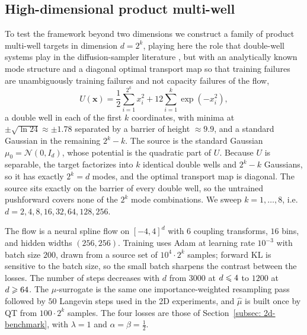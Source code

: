 \documentclass{article}
\begin{document}
\subsection{High-dimensional product multi-well}
\label{subsec: highd}

To test the framework beyond two dimensions we construct a family of product multi-well targets in dimension $d = 2^k$, playing here the role that double-well systems play in the diffusion-sampler literature \citep{akhound2024iterated,woo2024iefm}, but with an analytically known mode structure and a diagonal optimal transport map so that training failures are unambiguously training failures and not capacity failures of the flow,
\begin{equation}
    U(\mathbf{x}) = \frac12 \sum_{i=1}^{2^k} x_i^2 + 12 \sum_{i=1}^{k} \exp(-x_i^2),
    \label{eq: highd-potential}
\end{equation}
a double well in each of the first $k$ coordinates, with minima at $\pm\sqrt{\ln 24} \approx \pm 1.78$ separated by a barrier of height $\approx 9.9$, and a standard Gaussian in the remaining $2^k - k$. The source is the standard Gaussian $\mu_0 = \mathcal N(0, I_d)$, whose potential is the quadratic part of $U$. Because $U$ is separable, the target factorizes into $k$ identical double wells and $2^k - k$ Gaussians, so it has exactly $2^k = d$ modes, and the optimal transport map is diagonal. The source sits exactly on the barrier of every double well, so the untrained pushforward covers none of the $2^k$ mode combinations. We sweep $k = 1, \dots, 8$, i.e.\ $d = 2, 4, 8, 16, 32, 64, 128, 256$.

The flow is a neural spline flow on $[-4, 4]^d$ with $6$ coupling transforms, $16$ bins, and hidden widths $(256, 256)$. Training uses Adam at learning rate $10^{-3}$ with batch size $200$, drawn from a source set of $10^4 \cdot 2^k$ samples; forward KL is sensitive to the batch size, so the small batch sharpens the contrast between the losses. The number of steps decreases with $d$ from $3000$ at $d \leqslant 4$ to $1200$ at $d \geqslant 64$. The $\mu$-surrogate is the same one importance-weighted resampling pass followed by $50$ Langevin steps used in the 2D experiments, and $\hat\mu$ is built once by QT from $100 \cdot 2^k$ samples. The four losses are those of Section~\ref{subsec: 2d-benchmark}, with $\lambda = 1$ and $\alpha = \beta = \frac12$.
\end{document}
